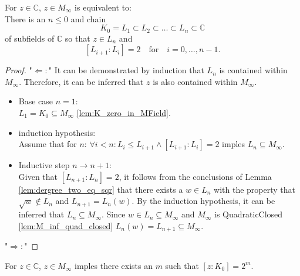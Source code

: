 \begin{theorem}
    \label{thm:Classfication_z_in_M_inf}
    For $z \in \mathbb{C}$, $z \in M_{\infty}$ is equivalent to:\\
    There is an $n\le 0$ and chain 
    $$K_0 = L_1 \subset L_2 \subset \ldots \subset L_n \subset \mathbb{C}$$
    of subfields of $\mathbb{C}$ so that $z \in L_n$ and 
    $$ [L_{i+1}:L_i] = 2 \quad \text{for} \quad i = 0, \ldots, n-1.$$
\end{theorem}

\begin{proof}
    "$\Leftarrow:$"
    It can be demonstrated by induction that $L_n$ is contained within $M_{\infty}$. 
    Therefore, it can be inferred that $z$ is also contained within $M_{\infty}$.
    \begin{itemize}
        \item Base case $n=1$: \\
            $L_1 = K_0 \subseteq M_{\infty}$ \ref{lem:K_zero_in_MField}.
        
        \item induction hypothesis: \\
            Assume that for $n$: $\forall i < n: L_i \le L_{i+1} \land [L_{i+1}:L_i]=2$ imples $L_n \subseteq M_{\infty}$.
        \item Inductive step $n \to n+1$: \\
            Given that $[L_{n+1}:L_n] = 2$, it follows from the conclusions of Lemma \ref{lem:dergree_two_eq_sqr} that there exists a $w \in L_n$ with the property that $ \sqrt{w} \notin L_n$ and $L_{n+1} = L_n(w)$.
            By the induction hypothesis, it can be inferred that $L_n \subseteq M_{\infty}$. Since $w \in L_n  \subseteq M_{\infty}$ and $ M_{\infty}$ is QuadraticClosed \ref{lem:M_inf_quad_closed} $L_n(w) = L_{n+1} \subseteq M_{\infty}$.
    \end{itemize}
    "$\Rightarrow:$"

\end{proof}

\begin{lemma}
    \label{lem:Classfication_z_in_M_inf_2m}
    For $z \in \mathbb{C}$, $z \in M_{\infty}$ imples there exists an $m$ such that $[z:K_0] = 2^m$.
\end{lemma}

